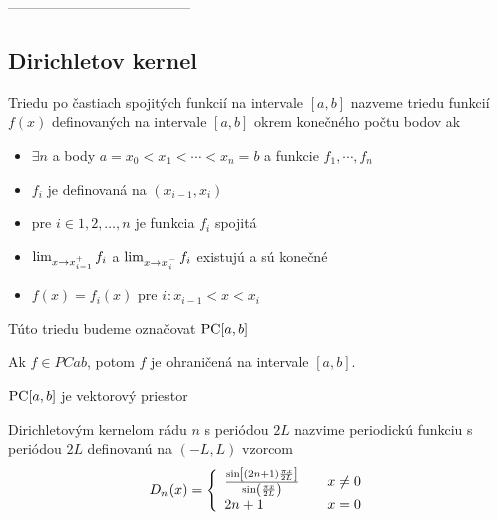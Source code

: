 ---------------------------------------
\subsection{Dirichletov kernel}
\begin{definicia}
    Triedu po častiach spojitých funkcií na intervale $[a,b]$ nazveme
    triedu funkcií $f(x)$ definovaných na intervale $[a,b]$ okrem
    konečného počtu bodov ak
    \begin{itemize}
        \item
            $\exists n$ a body $a=x_0<x_1<\cdots<x_n=b$ a funkcie
            $f_1, \cdots, f_n$
        \item
            $f_i$ je definovaná na $(x_{i-1},x_i)$
        \item
            pre $i \in 1,2,\dots,n$ je funkcia $f_i$ spojitá
        \item
            $\lim_{x \rightarrow x_{i-1}^+} f_i$ a 
            $\lim_{x \rightarrow x_i^-} f_i$ existujú a sú konečné
        \item
            $f(x) = f_i(x)$ pre $i: x_{i-1} < x < x_i$
    \end{itemize}
    Túto triedu budeme označovat $\mbox{PC}[a,b]$
\end{definicia}

\begin{lema}
    Ak $f \in PCab$, potom $f$ je ohraničená na intervale $[a,b]$.
    \label{lema:ohranicenost_na_pcab}
\end{lema}

\begin{lema}
    $\mbox{PC}[a,b]$ je vektorový priestor
\end{lema}
\begin{dokaz}
\end{dokaz}

\begin{definicia}
Dirichletovým kernelom  rádu $n$ s periódou $2L$ nazvime periodickú funkciu
s periódou $2L$ definovanú na $(-L,L)$ vzorcom
\begin{equation}
    D_n(x) = \left\{
        \begin{array}{l l}
            \frac{\sin\left[(2n+1) \frac{\pi x}{2 L}\right]}{
            \sin\left(\frac{\pi x}{2 L}\right)} \quad& x\not=0 \\
            2n+1 \quad& x=0
        \end{array}
    \right.
\end{equation}
\end{definicia}

